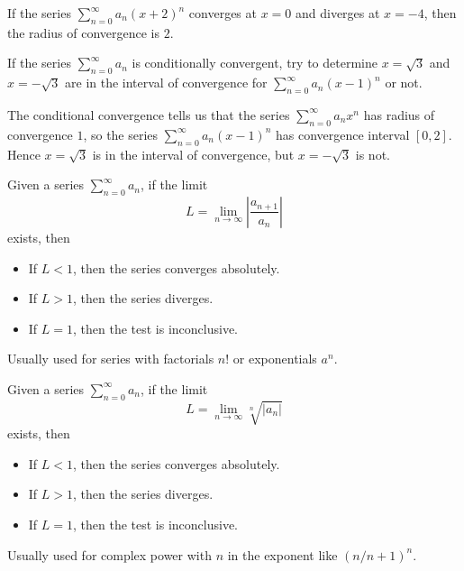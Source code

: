 \documentclass{overview}
\begin{document}
\begin{example}
	If the series $\sum_{n=0}^{\infty} a_n (x+2)^n$ converges at $x=0$ and diverges at
	 $x=-4$, then the radius of convergence is $2$.
\end{example}

\begin{example}
	If the series $\sum_{n=0}^{\infty} a_n$ is conditionally convergent, try to 
	determine $x=\sqrt{3}$ and $x=-\sqrt{3}$ are in the interval of convergence for
	$\sum_{n=0}^{\infty} a_n (x-1)^n$ or not.
	\begin{answer}
		The conditional convergence tells us that the series $\sum_{n=0}^{\infty} a_nx^n$
		has radius of convergence $1$, so the series $\sum_{n=0}^{\infty} a_n (x-1)^n$ has
		convergence interval $[0,2]$. Hence $x=\sqrt{3}$ is in the interval of convergence, but
		$x=-\sqrt{3}$ is not.
	\end{answer}
\end{example}


\begin{theorem}
	Given a series $\sum_{n=0}^{\infty} a_n$, if the limit
	\[
		L=\lim_{n\to\infty} \left| \frac{a_{n+1}}{a_n} \right|
	\] 
	exists, then
	\begin{itemize}
		\item If $L<1$, then the series converges absolutely.
		\item If $L>1$, then the series diverges.
		\item If $L=1$, then the test is inconclusive.
	\end{itemize}
\end{theorem}
\begin{remark}
	Usually used for series with factorials $n!$ or exponentials $a^n$.
\end{remark}
\begin{theorem}
	Given a series $\sum_{n=0}^{\infty} a_n$, if the limit
	\[
		L=\lim_{n\to\infty} \sqrt[n]{|a_n|}
	\] 
	exists, then
	\begin{itemize}
		\item If $L<1$, then the series converges absolutely.
		\item If $L>1$, then the series diverges.
		\item If $L=1$, then the test is inconclusive.
	\end{itemize}
\end{theorem}
\begin{remark}
	Usually used for complex power with $n$ in the exponent like $(n / n+1)^n$.
\end{remark}
\end{document}
